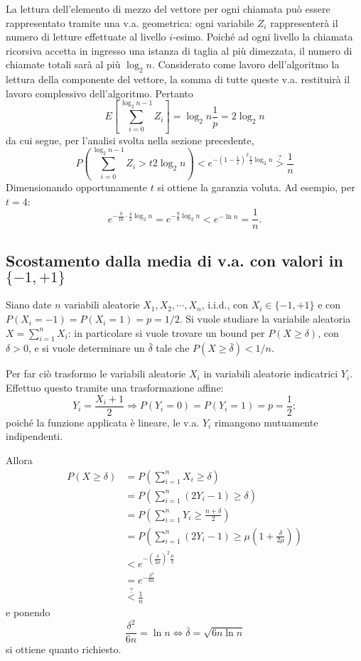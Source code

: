 La lettura dell'elemento di mezzo del vettore per ogni chiamata può essere rappresentato tramite una v.a. geometrica: ogni variabile $Z_i$ rappresenterà il numero di letture effettuate al livello $i$-esimo. Poiché ad ogni livello la chiamata ricorsiva accetta in ingresso una istanza di taglia al più dimezzata, il numero di chiamate totali sarà al più $\log_2 n$. Considerato come lavoro dell'algoritmo la lettura della componente del vettore, la somma di tutte queste v.a. restituirà il lavoro complessivo dell'algoritmo. Pertanto
\[
E\left[\sum_{i=0}^{\log_2 n-1}Z_i\right]=\log_2 n\frac{1}{p}=2\log_2 n
\]
da cui segue, per l'analisi svolta nella sezione precedente,
\[
P\left(\sum_{i=0}^{\log_2 n-1}Z_i > t2\log_2 n\right) < e^{-\left(1-\frac{1}{t}\right)^2\frac{t}{2}\log_2 n} \overset{?}{>} \frac{1}{n}
\]
Dimensionando opportunamente $t$ si ottiene la garanzia voluta. Ad esempio, per $t=4$:
\[
e^{-\frac{9}{16}\cdot\frac{4}{2}\log_2 n}=e^{-\frac{9}{8}\log_2 n} < e^{-\ln n} = \frac{1}{n}.
\]

\subsection{Scostamento dalla media di v.a. con valori in $\{-1,+1\}$}
Siano date $n$ variabili aleatorie $X_1, X_2,\cdots, X_n$, i.i.d., con $X_i\in\{-1,+1\}$ e con $P(X_i=-1)=P(X_i=1)=p=1/2$. Si vuole studiare la variabile aleatoria $X=\sum_{i=1}^nX_i$: in particolare si vuole trovare un bound per $P(X\geq \delta)$, con $\delta > 0$, e si vuole determinare un $\bar{\delta}$ tale che $P(X\geq\bar{\delta})<1/n$.

Per far ciò trasformo le variabili aleatorie $X_i$ in variabili aleatorie indicatrici $Y_i$. Effettuo questo tramite una trasformazione affine:
\[
Y_i=\frac{X_i+1}{2} \Rightarrow P(Y_i=0)=P(Y_i=1)=p=\frac{1}{2};
\]
poiché la funzione applicata è lineare, le v.a. $Y_i$ rimangono mutuamente indipendenti.

Allora
\begin{align*}
P(X\geq\delta)&=P\left(\sum_{i=1}^nX_i\geq\delta\right) \\
&=P\left(\sum_{i=1}^n(2Y_i-1)\geq\delta\right) \\
&=P\left(\sum_{i=1}^nY_i\geq\frac{n+\delta}{2}\right) \\
&=P\left(\sum_{i=1}^n(2Y_i-1)\geq\mu\left(1+\frac{\delta}{2\mu}\right)\right) \\
&<e^{-\left(\frac{\delta}{2\mu}\right)^2\frac{\mu}{3}} \\
&=e^{-\frac{\delta^2}{6n}} \\
&\overset{?}{<}\frac{1}{n}
\end{align*}
e ponendo
\[
\frac{\delta^2}{6n}=\ln n \Leftrightarrow \bar{\delta}=\sqrt{6n\ln n}
\]
si ottiene quanto richiesto.

